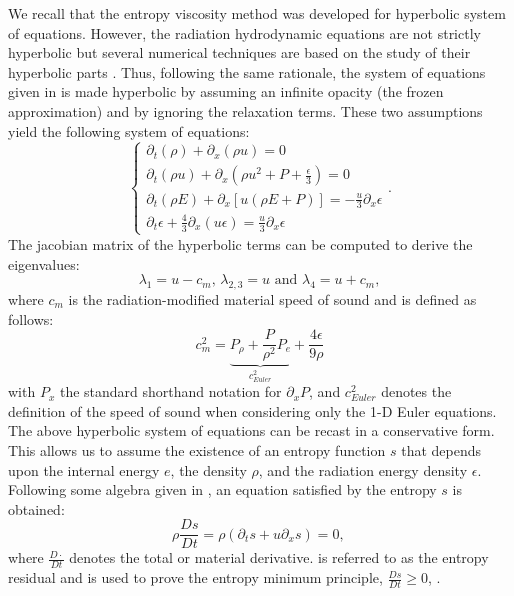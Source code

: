 \noindent
We recall that the entropy viscosity method was developed for hyperbolic system of equations. However, the radiation hydrodynamic equations are not strictly hyperbolic but several numerical techniques are based on the study of their hyperbolic parts \cite{Balsara, LowrieMorel}. Thus, following the same rationale, the system of equations given in  is made hyperbolic by assuming an infinite opacity (the frozen approximation) and by ignoring the relaxation terms. These two assumptions yield the following system of equations:
\begin{equation}
\label{eq:equation3}
\left\{
\begin{array}{lll}
\partial_t \left( \rho \right) + \partial_x\left( \rho u \right) = 0 \\
\partial_t \left( \rho u\right) + \partial_x \left(\rho u^2 + P + \frac{\epsilon}{3} \right) = 0 \\
\partial_t \left( \rho E\right) + \partial_x \left[ u \left( \rho E + P \right) \right] = -\frac{u}{3} \partial_x \epsilon\\
\partial_t \epsilon + \frac{4}{3} \partial_x \left( u \epsilon \right) = \frac{u}{3} \partial_x \epsilon
\end{array}
\right. .
\end{equation}
The jacobian matrix of the hyperbolic terms can be computed to derive the eigenvalues:
\begin{equation}
\label{eq:equation4}
\lambda_1 = u-c_m \text{, } \lambda_{2,3} = u \text{ and } \lambda_4 = u+c_m ,
\end{equation}
where $c_m$ is the radiation-modified material speed of sound and is defined as follows:
\begin{equation}
\label{eq:equation5}
c_m^2 = \underbrace{P_{\rho} + \frac{P}{\rho^2}P_e}_{c_{Euler}^2} + \frac{4 \epsilon}{9\rho}
\end{equation}
with $P_x$ the standard shorthand notation for $\partial_x P$, and $c^2_{Euler}$ denotes the definition of the speed of sound when considering only the 1-D Euler equations.
The above hyperbolic system of equations can be recast in a conservative form. This allows us to assume the existence of an entropy function $s$ \cite{Lax} that depends upon the internal energy $e$, the density $\rho$, and the radiation energy density $\epsilon$. Following some algebra given in , an equation satisfied by the entropy $s$ is obtained:
\begin{equation}
\label{eq:equation6}
\rho \frac{Ds}{Dt} = \rho \left( \partial_t s + u \partial_x s \right) = 0 \text{, }
\end{equation}
where $\frac{D \cdot}{Dt}$ denotes the total or material derivative.  is referred to as the entropy residual and is used to prove the entropy minimum principle, $\frac{Ds}{Dt} \geq 0$, \cite{entropy}.

